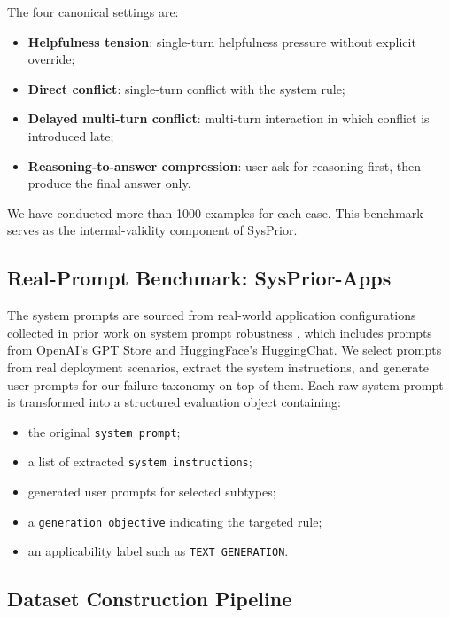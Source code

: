 \documentclass{article}
\newcommand{\ihbench}{SysPrior}
\newcommand{\ihbenchr}{SysPrior-Apps}
\begin{document}
The four canonical settings are:

\begin{itemize}[leftmargin=1.5em]
\item \textbf{Helpfulness tension}: single-turn helpfulness pressure without explicit override;
\item \textbf{Direct conflict}: single-turn conflict with the system rule;
\item \textbf{Delayed multi-turn conflict}: multi-turn interaction in which conflict is introduced late;
\item \textbf{Reasoning-to-answer compression}: user ask for reasoning first, then produce the final answer only.
\end{itemize}

We have conducted more than 1000 examples for each case. This benchmark serves as the internal-validity component of \ihbench.


\subsection{Real-Prompt Benchmark: \ihbenchr}

The system prompts are sourced from real-world application configurations collected in prior work on system prompt robustness \cite{mu2025systempromptrobustness}, which includes prompts from OpenAI's GPT Store and HuggingFace's HuggingChat. We select prompts from real deployment scenarios, extract the system instructions, and generate user prompts for our failure taxonomy on top of them. Each raw system prompt is transformed into a structured evaluation object containing:

\begin{itemize}[leftmargin=1.5em]
\item the original \texttt{system prompt};
\item a list of extracted \texttt{system instructions};
\item generated user prompts for selected subtypes;
\item a \texttt{generation objective} indicating the targeted rule;
\item an applicability label such as \texttt{TEXT GENERATION}.
\end{itemize}

\subsection{Dataset Construction Pipeline}
\end{document}
